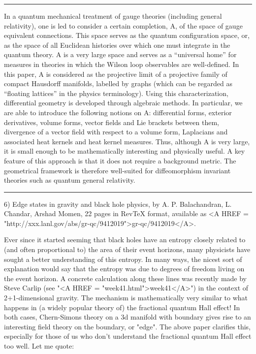 \par\noindent\rule{\textwidth}{0.4pt}
In a quantum mechanical treatment of gauge theories (including general
relativity), one is led to consider a certain completion, A, of the
space of gauge equivalent connections. This space serves as the quantum
configuration space, or, as the space of all Euclidean histories over
which one must integrate in the quantum theory.  A is a very large space
and serves as a ``universal home'' for measures in theories in which the
Wilson loop observables are well-defined. In this paper, A is considered
as the projective limit of a projective family of compact Hausdorff
manifolds, labelled by graphs (which can be regarded as ``floating
lattices'' in the physics terminology). Using this characterization,
differential geometry is developed through algebraic methods. In
particular, we are able to introduce the following notions on A:
differential forms, exterior derivatives, volume forms, vector fields
and Lie brackets between them, divergence of a vector field with respect
to a volume form, Laplacians and associated heat kernels and heat kernel
measures.  Thus, although A is very large, it is small enough to be
mathematically interesting and physically useful. A key feature of this
approach is that it does not require a background metric. The
geometrical framework is therefore well-suited for diffeomorphism
invariant theories such as quantum general relativity.
\par\noindent\rule{\textwidth}{0.4pt}

6)  Edge states in gravity and black hole physics, by A. P.
Balachandran, L. Chandar, Arshad Momen, 22 pages in RevTeX format,
available as <A HREF = "http://xxx.lanl.gov/abs/gr-qc/9412019">gr-qc/9412019</A>.  


Ever since it started seeming that black holes have an entropy closely
related to (and often proportional to) the area of their event horizons,
many physicists have sought a better understanding of this entropy.  In
many ways, the nicest sort of explanation would say that the entropy was
due to degrees of freedom living on the event horizon.  A concrete
calculation along these lines was recently made by Steve Carlip (see
"<A HREF = "week41.html">week41</A>") in the context of 2+1-dimensional gravity.  The mechanism 
is mathematically very similar to what happens in (a widely popular
theory of) the fractional quantum Hall effect!  In both cases, 
Chern-Simons theory on a 3d manifold with boundary gives rise to an
interesting field theory on the boundary, or "edge".  The above paper
clarifies this, especially for those of us who don't understand the
fractional quantum Hall effect too well.  Let me quote:

